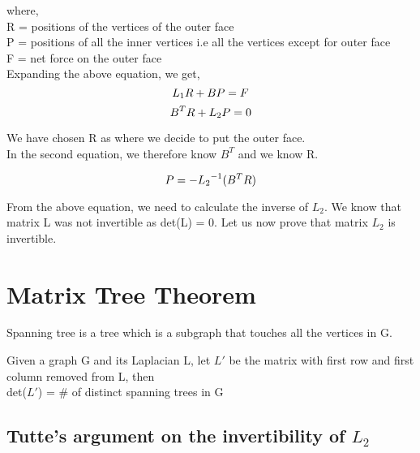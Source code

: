 \documentclass{article}
\begin{document}
    where, \\
    R = positions of the vertices of the outer face \\
    P = positions of all the inner vertices i.e all the vertices except for outer face\\
    F = net force on the outer face \\
    
    Expanding the above equation, we get, \\
    \newcommand{\dd}[1]{\mathrm{d}#1}
    \begin{equation}
    L_1R + BP = F \\    
    \end{equation}
    \begin{equation}
    B^TR + L_2P = 0 \\    
    \end{equation}
    
    We have chosen R as where we decide to put the outer face. \\
    In the second equation, we therefore know $B^T$ and we know R.
    
    \begin{equation}
    P = {-L_2}^{-1}(B^TR) \\    
    \end{equation}
    
    From the above equation, we need to calculate the inverse of $L_2$. We know that matrix L was not invertible as det(L) = 0. Let us now prove that matrix $L_2$ is invertible.
    
    \section{Matrix Tree Theorem}
    
    \begin{definition} Spanning tree is a tree which is a subgraph that touches all the vertices in G.
    \end{definition}
    
    Given a graph G and its Laplacian L,
    let $L'$ be the matrix with first row and first column removed from L, then\\
    det($L'$) = \# of distinct spanning trees in G
    
    \subsection{Tutte's argument on the invertibility of ${L_2}$}
    
\end{document}
